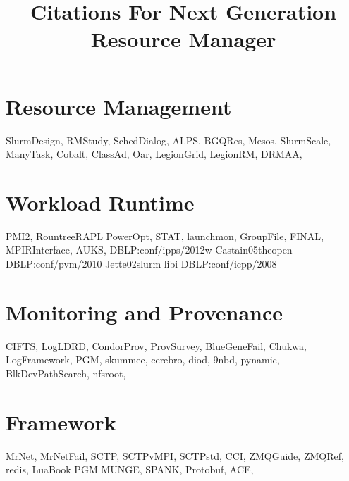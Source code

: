 \documentclass{article}
\newcommand{\ngrmfull}{Next Generation Resource Manager}
\begin{document}
\title{Citations For \ngrmfull}
\maketitle

\section{Resource Management}

SlurmDesign\cite{SlurmDesign},
RMStudy\cite{RMStudy},
SchedDialog\cite{SchedDialog},
ALPS\cite{ALPS},
BGQRes\cite{BGQRes},
Mesos\cite{Mesos},
SlurmScale\cite{SlurmScale},
ManyTask\cite{ManyTask},
Cobalt\cite{Cobalt},
ClassAd\cite{ClassAd},
Oar\cite{Oar},
LegionGrid\cite{LegionGrid},
LegionRM\cite{LegionRM},
DRMAA\cite{DRMAA},

\section{Workload Runtime}

PMI2\cite{PMI2},
RountreeRAPL\cite{RountreeRAPL}
PowerOpt\cite{PowerOpt},
STAT\cite{STAT},
launchmon\cite{launchmon},
GroupFile\cite{GroupFile},
FINAL\cite{FINAL},
MPIRInterface\cite{MPIRInterface},
AUKS\cite{AUKS},
DBLP:conf/ipps/2012w\cite{DBLP:conf/ipps/2012w}
Castain05theopen\cite{Castain05theopen}
DBLP:conf/pvm/2010\cite{DBLP:conf/pvm/2010}
Jette02slurm\cite{Jette02slurm}
libi\cite{libi}
DBLP:conf/icpp/2008\cite{DBLP:conf/icpp/2008}

\section{Monitoring and Provenance}

CIFTS\cite{CIFTS},
LogLDRD\cite{LogLDRD},
CondorProv\cite{CondorProv},
ProvSurvey\cite{ProvSurvey},
BlueGeneFail\cite{BlueGeneFail},
Chukwa\cite{Chukwa},
LogFramework\cite{LogFramework},
PGM\cite{rfc3208},
skummee\cite{skummee},
cerebro\cite{cerebro},
diod\cite{diod},
9nbd\cite{9nbd},
pynamic\cite{pynamic},
BlkDevPathSearch\cite{BlkDevPathSearch},
nfsroot\cite{nfsroot},

\section{Framework}

MrNet\cite{MrNet},
MrNetFail\cite{MrNetFail},
SCTP\cite{SCTP},
SCTPvMPI\cite{SCTPvMPI},
SCTPstd\cite{SCTPstd},
CCI\cite{CCI},
ZMQGuide\cite{ZMQGuide},
ZMQRef\cite{ZMQRef},
redis\cite{redis},
LuaBook\cite{LuaBook}
PGM\cite{rfc3208}
MUNGE\cite{munge},
SPANK\cite{SPANK},
Protobuf\cite{Protobuf},
ACE\cite{ACE},



\end{document}
